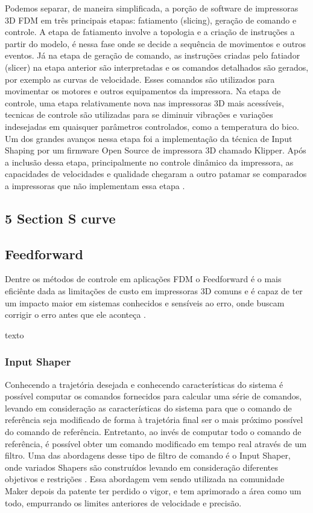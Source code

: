 Podemos separar, de maneira simplificada, a porção de software de impressoras 3D
FDM em três principais etapas: fatiamento (slicing), geração de comando e controle.
A etapa de fatiamento involve a topologia e a criação de instruções a partir do modelo,
é nessa fase onde se decide a sequência de movimentos e outros eventos.
Já na etapa de geração de comando, as instruções criadas pelo fatiador (slicer) na etapa anterior
são interpretadas e os comandos detalhados são gerados, por exemplo as curvas de velocidade.
Esses comandos são utilizados para movimentar os motores e outros equipamentos da impressora.
Na etapa de controle, uma etapa relativamente nova nas impressoras 3D mais acessíveis, 
tecnicas de controle são utilizadas para se diminuir vibrações e variações indesejadas em quaisquer
parâmetros controlados, como a temperatura do bico. Um dos grandes avanços nessa etapa
foi a implementação da técnica de Input Shaping por um firmware Open Source de impressora 3D chamado Klipper.
Após a inclusão dessa etapa, principalmente no controle dinâmico da impressora, as capacidades
de velocidades e qualidade chegaram a outro patamar se comparados a impressoras que não implementam essa etapa \cite{klipperdoc}.

\subsection{5 Section S curve}

\subsection{Feedforward}
Dentre os métodos de controle em aplicações FDM o Feedforward 
é o mais eficiênte dada as limitações de custo em impressoras 
3D comuns e é capaz de ter um impacto maior em sistemas 
conhecidos e sensíveis ao erro, onde buscam corrigir o erro 
antes que ele aconteça \cite{ramani20,duan18}.

texto

\subsubsection{Input Shaper}
Conhecendo a trajetória desejada e conhecendo características 
do sistema é possível computar os comandos fornecidos para 
calcular uma série de comandos, levando em consideração as 
características do sistema para que o comando de referência 
seja modificado de forma à trajetória final ser o mais próximo 
possível do comando de referência. Entretanto, ao invés de 
computar todo o comando de referência, é possível obter um 
comando modificado em tempo real através de um filtro. 
Uma das abordagens desse tipo de filtro de comando é o 
Input Shaper, onde variados Shapers são construídos levando 
em consideração diferentes objetivos e restrições 
\cite{singhose97}.
Essa abordagem vem sendo utilizada na comunidade Maker depois 
da patente ter perdido o vigor, e tem aprimorado a área como
um todo, empurrando os limites anteriores de velocidade e 
precisão.

